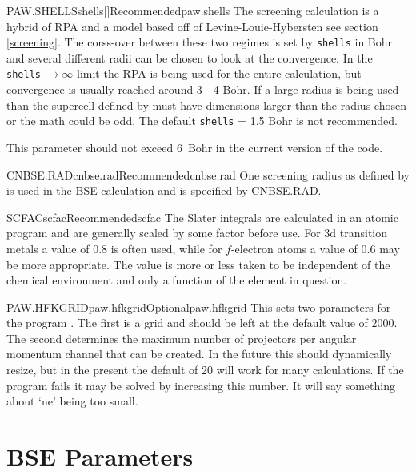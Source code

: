 \documentclass[11pt]{report}
\begin{document}
\begin{Card}{PAW.SHELLS}{shells[]}{Recommended}{paw.shells}
The screening calculation is a hybrid of RPA and a model based off of Levine-Louie-Hybersten see section \ref{screening}. The corss-over between these two regimes is set by \texttt{shells} in Bohr and several different radii can be chosen to look at the convergence. In the \texttt{shells} $\rightarrow \infty$ limit the RPA is being used for the entire calculation, but convergence is usually reached around 3 - 4 Bohr. If a large radius is being used than the supercell defined by  must have dimensions larger than the radius chosen or the math could be odd. The default \texttt{shells} = 1.5 Bohr is not recommended.

This parameter should not exceed 6~Bohr in the current version of the code.
\end{Card}

\begin{Card}{CNBSE.RAD}{cnbse.rad}{Recommended}{cnbse.rad}
One screening radius as defined by  is used in the BSE calculation and is specified by CNBSE.RAD. 
\end{Card}

\begin{Card}{SCFAC}{scfac}{Recommended}{scfac}
The Slater integrals are calculated in an atomic program and are generally scaled by some factor before use. For 3d transition metals a value of $0.8$ is often used, while for $f$-electron atoms a value of $0.6$ may be more appropriate. The value is more or less taken to be independent of the chemical environment and only a function of the element in question.
\end{Card}

\begin{Card}{PAW.HFKGRID}{paw.hfkgrid}{Optional}{paw.hfkgrid}
This sets two parameters for the program . The first is a grid and should be left at the default value of 2000. The second determines the maximum number of projectors per angular momentum channel that can be created. In the future this should dynamically resize, but in the present the default of 20 will work for many calculations. If the program  fails it may be solved by increasing this number. It will say something about `ne' being too small. 
\end{Card}


\section{BSE Parameters}
\label{sec:BSE-Parameters}
\end{document}
